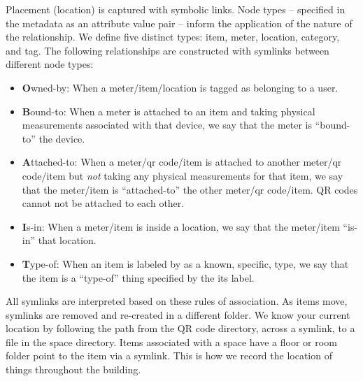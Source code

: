 Placement (location) is captured with symbolic links. Node types -- specified in the metadata as an attribute value pair -- inform 
the application of the nature of the relationship.  
We define five distinct types: item, meter, 
location, category, and tag.  The following relationships are constructed with symlinks between different node types:

\begin{itemize}
\item {\textbf Owned-by}: When a meter/item/location is tagged as belonging to a user.
\item {\textbf Bound-to}: When a meter is attached to an item and taking physical measurements associated with that 
		device, we say that the meter is ``bound-to'' the device.
\item {\textbf Attached-to}: When a meter/qr code/item is attached to another meter/qr code/item but \emph{not} taking any 
		physical measurements for that item, we say that the meter/item is ``attached-to'' the other meter/qr 
		code/item.  QR codes cannot not be attached to each other.
\item {\textbf Is-in}: When a meter/item is inside a location, we say that the meter/item ``is-in'' that location.
\item {\textbf Type-of}: When an item is labeled by as a known, specific, type, we say that the item is a ``type-of'' thing 
		specified by the its label.
\end{itemize}

All symlinks are interpreted based on these rules of association.  As items move, symlinks are removed and re-created
in a different folder.  We know your current location by following the path from the QR code directory, across a symlink, 
to a file in the space directory.  Items associated with a space have a floor or room folder point to the item
via a symlink.  This is how we record the location of things throughout the building.

